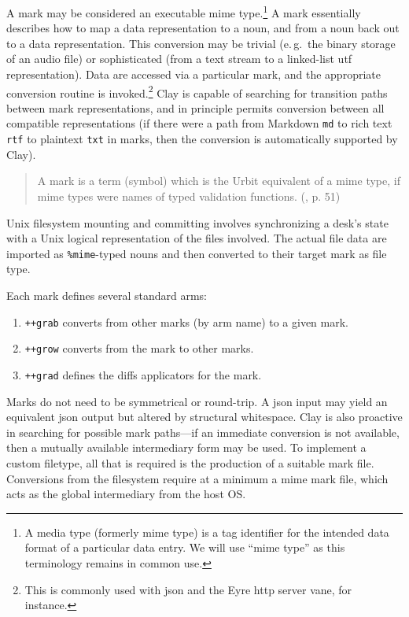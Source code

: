 \documentclass[twoside]{article}
\begin{document}
A mark may be considered an executable {\sc mime} type.\footnote{A media type (formerly {\sc mime} type) is a tag identifier for the intended data format of a particular data entry. We will use “{\sc mime} type” as this terminology remains in common use.}  A mark essentially describes how to map a data representation to a noun, and from a noun back out to a data representation.  This conversion may be trivial (e.\,g.\ the binary storage of an audio file) or sophisticated (from a text stream to a linked-list {\sc utf} representation).  Data are accessed via a particular mark, and the appropriate conversion routine is invoked.\footnote{This is commonly used with {\sc json} and the Eyre {\sc http} server vane, for instance.}  Clay is capable of searching for transition paths between mark representations, and in principle permits conversion between all compatible representations (if there were a path from Markdown \texttt{md} to rich text \texttt{rtf} to plaintext \texttt{txt} in marks, then the conversion is automatically supported by Clay).

\begin{quote}
  A mark is a term (symbol) which is the Urbit equivalent of a {\sc mime} type, if {\sc mime} types were names of typed validation functions.  (\citet{Whitepaper}, p. 51)
\end{quote}

Unix filesystem mounting and committing involves synchronizing a desk's state with a Unix logical representation of the files involved.  The actual file data are imported as \lstinline[style=inlinecode]{%mime}-typed nouns and then converted to their target mark as file type.

Each mark defines several standard arms:

\begin{enumerate}
  \item  \lstinline[style=inlinecode]{++grab} converts from other marks (by arm name) to a given mark.
  \item  \lstinline[style=inlinecode]{++grow} converts from the mark to other marks.
  \item  \lstinline[style=inlinecode]{++grad} defines the diffs applicators for the mark.
\end{enumerate}

\noindent
Marks do not need to be symmetrical or round-trip.  A {\sc json} input may yield an equivalent {\sc json} output but altered by structural whitespace.  Clay is also proactive in searching for possible mark paths—if an immediate conversion is not available, then a mutually available intermediary form may be used.  To implement a custom filetype, all that is required is the production of a suitable mark file.  Conversions from the filesystem require at a minimum a {\sc mime} mark file, which acts as the global intermediary from the host OS.
\end{document}
